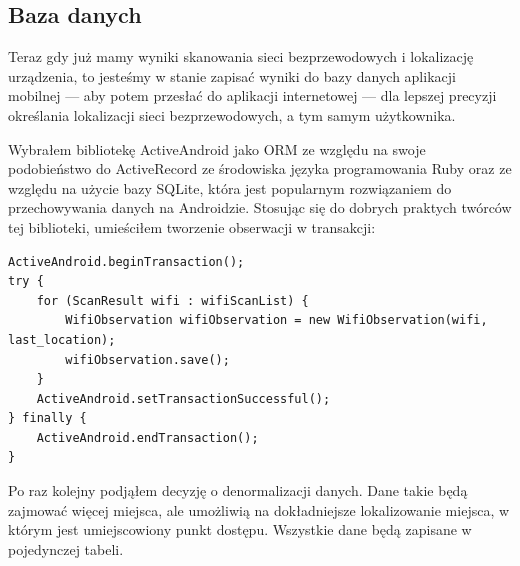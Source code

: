\subsection{Baza danych}
Teraz gdy już mamy wyniki skanowania sieci bezprzewodowych i lokalizację urządzenia, to jesteśmy w stanie zapisać wyniki do bazy danych aplikacji mobilnej — aby potem przesłać do aplikacji internetowej — dla lepszej precyzji określania lokalizacji sieci bezprzewodowych, a tym samym użytkownika.

Wybrałem bibliotekę ActiveAndroid jako ORM ze względu na swoje podobieństwo do ActiveRecord ze środowiska języka programowania Ruby oraz ze względu na użycie bazy SQLite, która jest popularnym rozwiązaniem do przechowywania danych na Androidzie. Stosując się do dobrych praktych twórców tej biblioteki, umieściłem tworzenie obserwacji w transakcji:

\begin{verbatim}
ActiveAndroid.beginTransaction();
try {
    for (ScanResult wifi : wifiScanList) {
        WifiObservation wifiObservation = new WifiObservation(wifi, last_location);
        wifiObservation.save();
    }
    ActiveAndroid.setTransactionSuccessful();
} finally {
    ActiveAndroid.endTransaction();
}
\end{verbatim}

Po raz kolejny podjąłem decyzję o denormalizacji danych. Dane takie będą zajmować więcej miejsca, ale umożliwią na dokładniejsze lokalizowanie miejsca, w którym jest umiejscowiony punkt dostępu. Wszystkie dane będą zapisane w pojedynczej tabeli.


